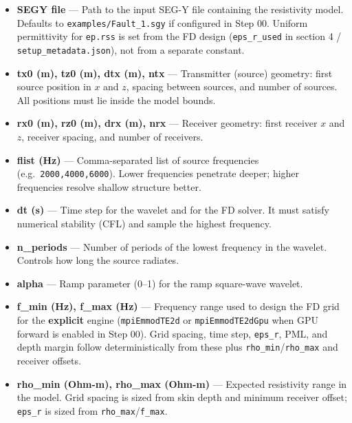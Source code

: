 \documentclass[11pt,a4paper]{article}
\begin{document}
\begin{itemize}

  \item \textbf{SEGY file} — Path to the input SEG-Y file containing the resistivity model. Defaults to \texttt{examples/Fault\_1.sgy} if configured in Step 00. Uniform permittivity for \texttt{ep.rss} is set from the FD design (\texttt{eps\_r\_used} in section 4 / \texttt{setup\_metadata.json}), not from a separate constant.

  \item \textbf{tx0 (m), tz0 (m), dtx (m), ntx} — Transmitter (source) geometry: first source position in $x$ and $z$, spacing between sources, and number of sources. All positions must lie inside the model bounds.

  \item \textbf{rx0 (m), rz0 (m), drx (m), nrx} — Receiver geometry: first receiver $x$ and $z$, receiver spacing, and number of receivers.

  \item \textbf{flist (Hz)} — Comma-separated list of source frequencies (e.g.\ \texttt{2000,4000,6000}). Lower frequencies penetrate deeper; higher frequencies resolve shallow structure better.

  \item \textbf{dt (s)} — Time step for the wavelet and for the FD solver. It must satisfy numerical stability (CFL) and sample the highest frequency.

  \item \textbf{n\_periods} — Number of periods of the lowest frequency in the wavelet. Controls how long the source radiates.

  \item \textbf{alpha} — Ramp parameter (0--1) for the ramp square-wave wavelet.

  \item \textbf{f\_min (Hz), f\_max (Hz)} — Frequency range used to design the FD grid for the \textbf{explicit} engine (\texttt{mpiEmmodTE2d} or \texttt{mpiEmmodTE2dGpu} when GPU forward is enabled in Step 00). Grid spacing, time step, \texttt{eps\_r}, PML, and depth margin follow deterministically from these plus \texttt{rho\_min}/\texttt{rho\_max} and receiver offsets.

  \item \textbf{rho\_min (Ohm-m), rho\_max (Ohm-m)} — Expected resistivity range in the model. Grid spacing is sized from skin depth and minimum receiver offset; \texttt{eps\_r} is sized from \texttt{rho\_max}/\texttt{f\_max}.


\end{itemize}
\end{document}
